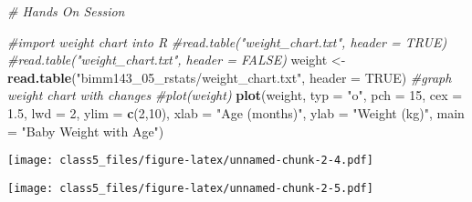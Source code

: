 \documentclass[]{article}
\newenvironment{Shaded}{\begin{snugshade}}{\end{snugshade}}
\newcommand{\KeywordTok}[1]{\textcolor[rgb]{0.13,0.29,0.53}{\textbf{#1}}}
\newcommand{\DataTypeTok}[1]{\textcolor[rgb]{0.13,0.29,0.53}{#1}}
\newcommand{\DecValTok}[1]{\textcolor[rgb]{0.00,0.00,0.81}{#1}}
\newcommand{\FloatTok}[1]{\textcolor[rgb]{0.00,0.00,0.81}{#1}}
\newcommand{\CharTok}[1]{\textcolor[rgb]{0.31,0.60,0.02}{#1}}
\newcommand{\StringTok}[1]{\textcolor[rgb]{0.31,0.60,0.02}{#1}}
\newcommand{\CommentTok}[1]{\textcolor[rgb]{0.56,0.35,0.01}{\textit{#1}}}
\newcommand{\OtherTok}[1]{\textcolor[rgb]{0.56,0.35,0.01}{#1}}
\newcommand{\OperatorTok}[1]{\textcolor[rgb]{0.81,0.36,0.00}{\textbf{#1}}}
\newcommand{\NormalTok}[1]{#1}
\begin{document}
\begin{Shaded}
\begin{Highlighting}[]
\CommentTok{# Hands On Session}

\CommentTok{#import weight chart into R}
\CommentTok{#read.table("weight_chart.txt", header = TRUE)}
\CommentTok{#read.table("weight_chart.txt", header = FALSE)}
\NormalTok{weight <-}\StringTok{ }\KeywordTok{read.table}\NormalTok{(}\StringTok{"bimm143_05_rstats/weight_chart.txt"}\NormalTok{, }\DataTypeTok{header =} \OtherTok{TRUE}\NormalTok{)}
\CommentTok{#graph weight chart with changes}
\CommentTok{#plot(weight)}
\KeywordTok{plot}\NormalTok{(weight, }\DataTypeTok{typ =} \StringTok{"o"}\NormalTok{, }\DataTypeTok{pch =} \DecValTok{15}\NormalTok{, }\DataTypeTok{cex =} \FloatTok{1.5}\NormalTok{, }\DataTypeTok{lwd =} \DecValTok{2}\NormalTok{, }\DataTypeTok{ylim =} \KeywordTok{c}\NormalTok{(}\DecValTok{2}\NormalTok{,}\DecValTok{10}\NormalTok{), }\DataTypeTok{xlab =} \StringTok{"Age (months)"}\NormalTok{, }\DataTypeTok{ylab =} \StringTok{"Weight (kg)"}\NormalTok{, }\DataTypeTok{main =} \StringTok{"Baby Weight with Age"}\NormalTok{)}
\end{Highlighting}
\end{Shaded}

\texttt{[image: class5\_files/figure-latex/unnamed-chunk-2-4.pdf]}

\begin{Shaded}
\end{Shaded}

\texttt{[image: class5\_files/figure-latex/unnamed-chunk-2-5.pdf]}

\begin{Shaded}
\end{Shaded}
\end{document}
